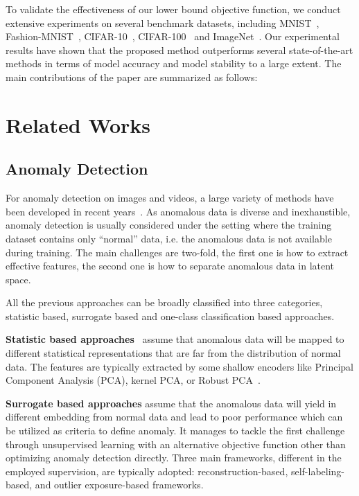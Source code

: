 \documentclass[journal]{IEEEtran}
\theoremstyle{remark}
\begin{document}
To validate the effectiveness of our lower bound objective function, we conduct extensive experiments on several benchmark datasets, including MNIST~\cite{lecun1998mnist}, Fashion-MNIST~\cite{xiao2017fashion}, CIFAR-10~\cite{krizhevsky2009learning}, CIFAR-100~\cite{krizhevsky2009learning} and ImageNet~\cite{russakovsky2015imagenet}.
Our experimental results have shown that the proposed method outperforms several state-of-the-art methods in terms of model accuracy and model stability to a large extent. The main contributions of the paper are summarized as follows:

\section{Related Works}
\subsection{Anomaly Detection}

For anomaly detection on images and videos, a large variety of methods have been developed in recent years~\cite{Chalapathy2019Deep, Markou2003Novelty_V1, Markou2003Novelty_V2, chandola2009anomaly, Pimentel2014A, Kiran2018An, chu2018sparse, xu2018anomaly, xu2019video}.  
As anomalous data is diverse and inexhaustible, anomaly detection is usually considered under the setting where the training dataset contains only ``normal'' data, i.e. the anomalous data is not available during training. The main challenges are two-fold, the first one is how to extract effective features, the second one is how to separate anomalous data in latent space.

All the previous approaches can be broadly classified into three categories, statistic based, surrogate based and one-class classification based approaches.

\textbf{Statistic based approaches}~\cite{Eskin2000Anomaly, Yamanishi2000On, Rahmani2017Coherence} assume that anomalous data will be mapped to different statistical representations that are far from the distribution of normal data. The features are typically extracted by some shallow encoders like Principal Component Analysis (PCA), kernel PCA, or Robust PCA~\cite{Xu2012Robust}.

\textbf{Surrogate based approaches} assume that the anomalous data will yield in different embedding from normal data and lead to poor performance which can be utilized as criteria to define anomaly. It manages to tackle the first challenge through unsupervised learning with an alternative objective function other than optimizing anomaly detection directly.  Three main frameworks, different in the employed supervision, are typically adopted: reconstruction-based, self-labeling-based, and outlier exposure-based frameworks.
\end{document}
